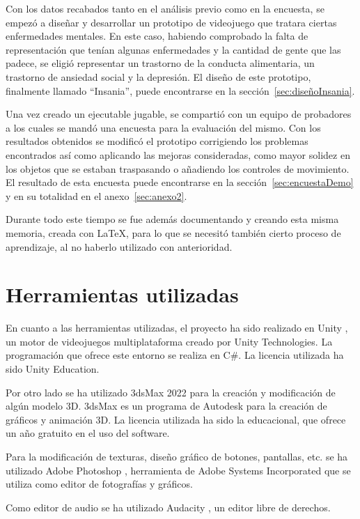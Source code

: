 \documentclass[12pt, a4paper,twoside,titlepage]{book}
\begin{document}
Con los datos recabados tanto en el análisis previo como en la encuesta, se empezó a diseñar y desarrollar un prototipo de videojuego que tratara ciertas enfermedades mentales. En este caso, habiendo comprobado la falta de representación que tenían algunas enfermedades y la cantidad de gente que las padece, se eligió representar un trastorno de la conducta alimentaria, un trastorno de ansiedad social y la depresión. El diseño de este prototipo, finalmente llamado ``Insania'', puede encontrarse en la sección~\ref{sec:diseñoInsania}. 

Una vez creado un ejecutable jugable, se compartió con un equipo de probadores a los cuales se mandó una encuesta para la evaluación del mismo. Con los resultados obtenidos se modificó el prototipo corrigiendo los problemas encontrados así como aplicando las mejoras consideradas, como mayor solidez en los objetos que se estaban traspasando o añadiendo los controles de movimiento. El resultado de esta encuesta puede encontrarse en la sección~\ref{sec:encuestaDemo} y en su totalidad en el anexo~\ref{sec:anexo2}. 

Durante todo este tiempo se fue además documentando y creando esta misma memoria, creada con \LaTeX, para lo que se necesitó también cierto proceso de aprendizaje, al no haberlo utilizado con anterioridad. 



\section{Herramientas utilizadas}
En cuanto a las herramientas utilizadas, el proyecto ha sido realizado en Unity \cite{unity}, un motor de videojuegos multiplataforma creado por Unity Technologies. La programación que ofrece este entorno se realiza en C\#. La licencia utilizada ha sido Unity Education. 

Por otro lado se ha utilizado 3dsMax 2022 \cite{3dsmax} para la creación y modificación de algún modelo 3D. 3dsMax es un programa de Autodesk para la creación de gráficos y animación 3D. La licencia utilizada ha sido la educacional, que ofrece un año gratuito en el uso del software. 

Para la modificación de texturas, diseño gráfico de botones, pantallas, etc. se ha utilizado Adobe Photoshop \cite{photoshop}, herramienta de Adobe Systems Incorporated que se utiliza como editor de fotografías y gráficos. 

Como editor de audio se ha utilizado Audacity \cite{audacity}, un editor libre de derechos. 
\end{document}
